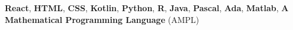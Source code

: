 %
%
%

\par{\textbf{React}, \textbf{HTML}, \textbf{CSS}, \textbf{Kotlin}, \textbf{Python}, \textbf{R}, \textbf{Java}, \textbf{Pascal}, \textbf{Ada}, \textbf{Matlab}, \textbf{A Mathematical Programming Language} (AMPL)
}
